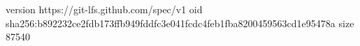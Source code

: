 version https://git-lfs.github.com/spec/v1
oid sha256:b892232ce2fdb173ffb949fddfc3e041fcdc4feb1fba8200459563cd1e95478a
size 87540
